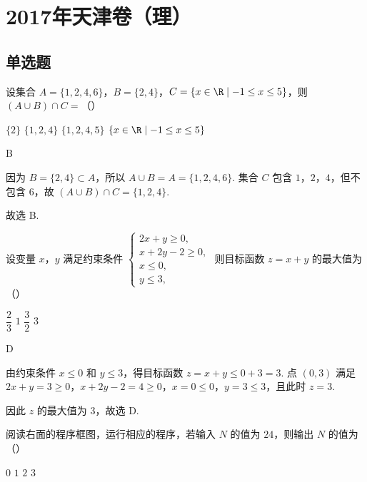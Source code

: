 \chapter{2017年天津卷（理）}

\section{单选题}

\begin{problem}
设集合 \(A=\{1,2,4,6\}\)，\(B=\{2,4\}\)，\(C=\{x\in\R\mid -1\le x\le 5\}\)，则 \((A\cup B)\cap C=\)（\quad）

\choices
    {\(\{2\}\)}
    {\(\{1,2,4\}\)}
    {\(\{1,2,4,5\}\)}
    {\(\{x\in\R\mid -1\le x\le 5\}\)}
\end{problem}

\begin{answer}
B
\end{answer}

\begin{solution}
因为 \(B=\{2,4\}\subset A\)，所以 \(A\cup B=A=\{1,2,4,6\}\). 集合 \(C\) 包含 \(1\)，\(2\)，\(4\)，但不包含 \(6\)，故
\((A\cup B)\cap C=\{1,2,4\}\).

故选 B.
\end{solution}

\begin{problem}
设变量 \(x\)，\(y\) 满足约束条件
\(\begin{cases}
2x+y\ge 0,\\
x+2y-2\ge 0,\\
x\le 0,\\
y\le 3,
\end{cases}\)
则目标函数 \(z=x+y\) 的最大值为（\quad）

\choices
    {\(\dfrac{2}{3}\)}
    {\(1\)}
    {\(\dfrac{3}{2}\)}
    {\(3\)}
\end{problem}

\begin{answer}
D
\end{answer}

\begin{solution}
由约束条件 \(x\leq 0\) 和 \(y\leq 3\)，得目标函数
\(z=x+y\leq 0+3=3\). 点 \((0,3)\) 满足
\(2x+y=3\geq 0\)，\(x+2y-2=4\geq 0\)，\(x=0\leq 0\)，\(y=3\leq 3\)，且此时 \(z=3\).

因此 \(z\) 的最大值为 \(3\)，故选 D.
\end{solution}

\begin{problem}
阅读右面的程序框图，运行相应的程序，若输入 \(N\) 的值为 \(24\)，则输出 \(N\) 的值为（\quad）


\choices
    {\(0\)}
    {\(1\)}
    {\(2\)}
    {\(3\)}
\end{problem}

